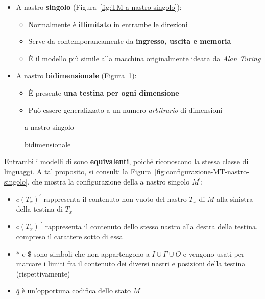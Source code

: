 \documentclass[italian, 10pt]{article}
\begin{document}
\begin{itemize}
  \item A nastro \textbf{singolo} (Figura~\ref{fig:TM-a-nastro-singolo}):
        \begin{itemize}
          \item Normalmente è \textbf{illimitato} in entrambe le direzioni
          \item Serve da contemporaneamente da \textbf{ingresso, uscita e memoria}
          \item È il modello più simile alla macchina originalmente ideata da \textit{Alan Turing}
        \end{itemize}
  \item A nastro \textbf{bidimensionale} (Figura~\ref{fig:TM-bidimensionale}):
        \begin{itemize}
          \item È presente \textbf{una testina per ogni dimensione}
          \item Può essere generalizzato a un numero \textit{arbitrario} di dimensioni
        \end{itemize}
\end{itemize}

\begin{figure}[htbp]
  \bigskip
  \centering
  \begin{minipage}[b]{.45\textwidth}
    \centering
    \caption{\TM a nastro singolo}
    \label{fig:TM-a-nastro-singolo}
  \end{minipage}
  \begin{minipage}[b]{.45\textwidth}
    \centering
    \caption{\TM bidimensionale}
    \label{fig:TM-bidimensionale}
  \end{minipage}
  \bigskip
\end{figure}

Entrambi i modelli di \TM sono \textbf{equivalenti}, poiché riconoscono la stessa classe di linguaggi.
A tal proposito, si consulti la Figura~\ref{fig:configurazione-MT-nastro-singolo}, che mostra la configurazione della \TM a nastro singolo \(M^\prime\):

\begin{itemize}
  \item \(c(T_x)^\prime\) rappresenta il contenuto non vuoto del nastro \(T_x\) di \(M\) alla sinistra della testina di \(T_x\)
  \item \(c(T_x)^{\prime\prime}\) rappresenta il contenuto dello stesso nastro alla destra della testina, compreso il carattere sotto di essa
  \item \(\ast\) e \(\$\) sono simboli che non appartengono a \(I \cup \Gamma \cup O\) e vengono usati per marcare i limiti fra il contenuto dei diversi nastri e posizioni della testina (rispettivamente)
  \item \(\overline{q}\) è un'opportuna codifica dello stato \(M\)
\end{itemize}
\end{document}
